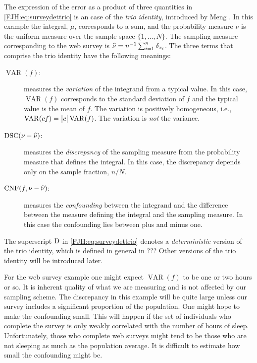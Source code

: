 \documentclass[graybox,footinfo]{svmult}
\DeclareMathOperator{\algn}{CNF}
\DeclareMathOperator{\disc}{DSC}
\DeclareMathOperator{\Var}{VAR}
\begin{document}
The expression of the error as a product of three quantities in 
\eqref{FJH:eq:surveydettrio} is an case of the \emph{trio identity}, introduced by Meng 
\cite{Men16a}.  In this example the integral, $\mu$, corresponds to a sum, 
and the probability measure $\nu$ is the uniform measure over the sample space $\{1, 
\ldots, N\}$.  The sampling measure corresponding to the web survey is $\widehat{\nu} = 
n^{-1} \sum_{i=1}^n \delta_{x_i}$.  The three terms that comprise the trio identity have the 
following meanings:
\begin{description}
	\item[$\Var(f)$:] measures the \emph{variation} of the integrand from a typical value. 
	In 	this case, $\Var(f)$ corresponds to the standard deviation of $f$ and the typical 
	value	is the mean of $f$. The variation is positively homogeneous, i.e., $\Var(cf)  = 
	\abs{c} \Var(f)$.  The variation is \emph{not} the variance.
	\item [$\disc(\nu - \hnu)$:] measures the \emph{discrepancy} of the sampling 
	measure 
	from the probability measure that defines the integral.  In this case, the discrepancy 
	depends only on the sample fraction, $n/N$.
	\item [$\algn(f,\nu - \hnu)$:] measures the \emph{confounding} between the 
	integrand and the difference between the measure defining the integral and the 
	sampling measure.  In this case the confounding lies between plus and minus one.
\end{description}
The superscript $\textup{D}$ in \eqref{FJH:eq:surveydettrio} denotes a \emph{deterministic} 
version of the trio identity, which is defined in general in ???  Other versions of the trio 
identity will be introduced later.

For the web survey example one might expect $\Var(f)$ to be one or two hours or so.  It 
is inherent quality of what we are measuring and is not affected by our sampling 
scheme.  The discrepancy in this example will be quite large unless our survey includes a 
significant proportion of the population.  One might hope to make  the confounding 
small.  This will happen if the set of individuals who complete the survey 
is only weakly correlated with the number of hours of sleep.  Unfortunately, those who  
complete web surveys might tend to be those who are not sleeping as much as the 
population average.  It is difficult to estimate how small the confounding might be.  
\end{document}
